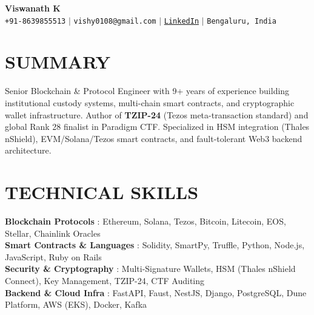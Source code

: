 \documentclass[letterpaper,11pt]{article}
\begin{document}
\begin{center}
    \textbf{\Huge Viswanath K} \\ \vspace{5pt}
    \small \faPhone* \texttt{+91-8639855513} \hspace{1pt} $|$
    \hspace{1pt} \faEnvelope \hspace{2pt} \texttt{vishy0108@gmail.com} \hspace{1pt} $|$
    \hspace{1pt} \faLinkedin \hspace{2pt} \texttt{\href{https://www.linkedin.com/in/viswanath-k-5852a3143/}{LinkedIn}} \hspace{1pt} $|$
    \hspace{1pt} \faMapMarker* \hspace{2pt}\texttt{Bengaluru, India}
    \\ \vspace{-3pt}
\end{center}

\section{SUMMARY}
  \small{Senior Blockchain \& Protocol Engineer with 9+ years of experience building institutional custody systems, multi-chain smart contracts, and cryptographic wallet infrastructure. Author of \textbf{TZIP-24} (Tezos meta-transaction standard) and global Rank 28 finalist in Paradigm CTF. Specialized in HSM integration (Thales nShield), EVM/Solana/Tezos smart contracts, and fault-tolerant Web3 backend architecture.}

\section{TECHNICAL SKILLS}
 \begin{itemize}[leftmargin=0in, label={}]
    \small{\item{
     \textbf{Blockchain Protocols} {: Ethereum, Solana, Tezos, Bitcoin, Litecoin, EOS, Stellar, Chainlink Oracles} \vspace{2pt} \\
     \textbf{Smart Contracts \& Languages} {: Solidity, SmartPy, Truffle, Python, Node.js, JavaScript, Ruby on Rails} \vspace{2pt} \\
     \textbf{Security \& Cryptography} {: Multi-Signature Wallets, HSM (Thales nShield Connect), Key Management, TZIP-24, CTF Auditing} \vspace{2pt} \\
     \textbf{Backend \& Cloud Infra} {: FastAPI, Faust, NestJS, Django, PostgreSQL, Dune Platform, AWS (EKS), Docker, Kafka}
    }}
 \end{itemize}
\end{document}
